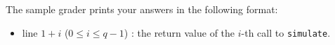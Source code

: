 The sample grader prints your answers in the following format:
\begin{itemize}
\item line $1 + i$ ($0 \leq i \leq q - 1$) : the return value of the $i$-th call to \texttt{simulate}.
\end{itemize}